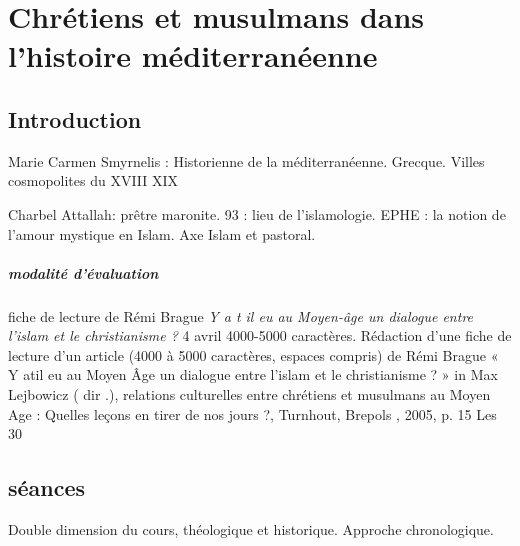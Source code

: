 \chapter{Chrétiens et musulmans dans l'histoire méditerranéenne}


\section{Introduction}

Marie Carmen Smyrnelis : Historienne de la méditerranéenne. Grecque. Villes cosmopolites du XVIII XIX

Charbel Attallah: prêtre maronite. 93 : lieu de l'islamologie. EPHE : la notion de l'amour mystique en Islam. Axe Islam et pastoral. 


\paragraph{modalité d'évaluation} fiche de lecture de Rémi Brague \textit{Y a t il eu au Moyen-âge un dialogue entre l'islam et le christianisme ?} 4 avril 4000-5000 caractères. 
Rédaction d’une fiche de lecture d’un article (4000 à 5000 caractères, espaces compris) de Rémi Brague « Y atil eu au Moyen Âge un dialogue entre l’islam et le christianisme ? » in Max Lejbowicz ( dir .), relations culturelles entre chrétiens et musulmans au Moyen Age : Quelles leçons en tirer de nos jours ?, Turnhout,  Brepols , 2005, p. 15 Les 30
\section{séances}
Double dimension du cours, théologique et historique.
Approche chronologique. 

